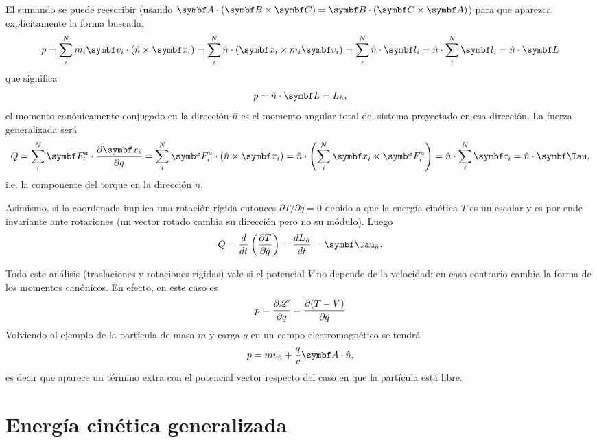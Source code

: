 \documentclass[10pt,oneside]{CBFT_book}
\begin{document}
El sumando se puede reescribir (usando $\vb{A}\cdot(\vb{B}\times\vb{C}) = 
\vb{B}\cdot(\vb{C}\times\vb{A})$) para que aparezca explícitamente la forma buscada,
\[
	p = \sum_i^N m_i \vb{v}_i \cdot ( \hat{n} \times \vb{x}_i ) =
	\sum_i^N \hat{n} \cdot ( \vb{x}_i \times m_i \vb{v}_i  ) =
	\sum_i^N \hat{n} \cdot \vb{l}_i = \hat{n} \cdot \sum_i^N \vb{l}_i =
	\hat{n} \cdot \vb{L}
\]
que significa
\[
	p = \hat{n} \cdot \vb{L} = L_{\hat{n}},
\]
el momento canónicamente conjugado en la dirección $\hat{n}$ es el momento angular total
del sistema proyectado en esa dirección.
La fuerza generalizada será
\[
	Q = \sum_i^N \vb{F}^a_i \cdot \dpar{\vb{x}_i}{q} = 
	\sum_i^N \vb{F}^a_i \cdot ( \hat{n} \times \vb{x}_i ) = 
	\hat{n} \cdot \left( \sum_i^N \vb{x}_i \times  \vb{F}^a_i \right) = 
	\hat{n} \cdot \sum_i^N \vb{\tau}_i = \hat{n} \cdot \vb{\Tau},
\]
i.e. la componente del torque en la dirección $ \hat{n} $.

Asimismo, si la coordenada implica una rotación rígida entonces $ \partial{T}/\partial{q} = 0 $ 
debido a que la energía cinética $ T $ es un escalar y es por ende invariante ante rotaciones
(un vector rotado cambia su dirección pero no su módulo).
Luego
\[
	Q = \frac{d}{dt}\left( \dpar{T}{\dot{q}} \right) = \dtot{L_{\hat{n}}}{t} = \vb{\Tau}_{\hat{n}}.
\]

Todo este análisis (traslaciones y rotaciones rígidas) vale si el potencial $V$ no depende de la
velocidad; en caso contrario cambia la forma de los momentos canónicos. En efecto, en este caso
es
\[
	p = \frac{\partial^{\hspace{-0.05em}} { \mathscr{L} }}{\partial {\dot{q}}^{\hspace{-0.05em}}} = \frac{\partial^{\hspace{-0.05em}} {(T-V)}}{\partial {\dot{q}}^{\hspace{-0.05em}}}
\]
Volviendo al ejemplo de la partícula de masa $m$ y carga $q$ en un campo electromagnético se tendrá
\[
	p = m v_{\hat{n}} + \frac{q}{c} \vb{A}\cdot\hat{n},
\]
es decir que aparece un término extra con el potencial vector respecto del caso en que la partícula
está libre.

\section{Energía cinética generalizada}
\end{document}
